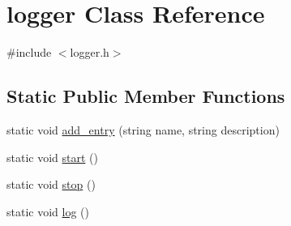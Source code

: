\hypertarget{classlogger}{}\section{logger Class Reference}
\label{classlogger}


{\ttfamily \#include $<$logger.\+h$>$}

\subsection*{Static Public Member Functions}
\begin{DoxyCompactItemize}
\item 
static void \hyperlink{classlogger_a710163deb17bc81f70d53d285b8ac9ac}{add\+\_\+entry} (string name, string description)
\item 
static void \hyperlink{classlogger_afba86118a3bb044060be8309b3fa755a}{start} ()
\item 
static void \hyperlink{classlogger_abb856642f4e62c7a4a11cc4a2d963010}{stop} ()
\item 
static void \hyperlink{classlogger_ab518e6d927694bb7329e933fa75c27bf}{log} ()
\end{DoxyCompactItemize}
